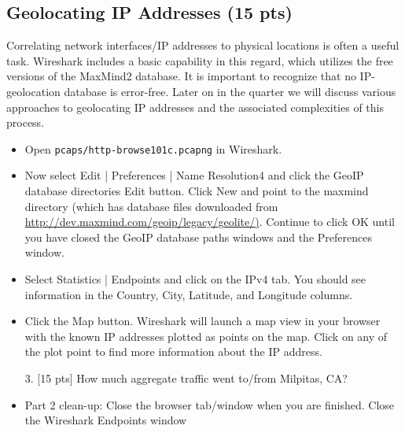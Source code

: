 \subsection{Geolocating IP Addresses (15 pts)}
Correlating network interfaces/IP addresses to physical locations is often a useful task. Wireshark
includes a basic capability in this regard, which utilizes the free versions of the MaxMind2
database. It is important to recognize that no IP-geolocation database is error-free.
Later on in the quarter we will discuss various approaches to geolocating IP addresses and
the associated complexities of this process.
\begin{itemize}
\item Open {\tt pcaps/http-browse101c.pcapng} in Wireshark.
\item Now select Edit | Preferences
| Name Resolution4 and click the GeoIP database directories Edit button. Click
New and point to the maxmind directory (which has database files downloaded from
\url{http://dev.maxmind.com/geoip/legacy/geolite/)}. Continue to click OK until you have
closed the GeoIP database paths windows and the Preferences window.
\item Select Statistics | Endpoints and click on the IPv4 tab. You should see information
in the Country, City, Latitude, and Longitude columns.
\item Click the Map button. Wireshark will launch a map view in your browser with the
known IP addresses plotted as points on the map. Click on any of the plot point to
find more information about the IP address.
\item[3.] [15 pts] How much aggregate traffic went to/from Milpitas, CA?
\item Part 2 clean-up: Close the browser tab/window when you are finished. Close the
Wireshark Endpoints window
\end{itemize}


